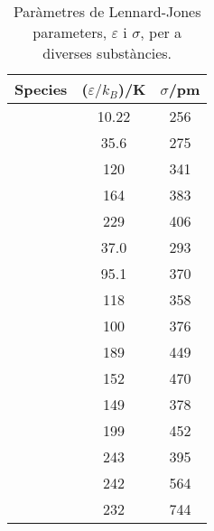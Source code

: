\begin{table}[h]
  \centering
  \caption{Paràmetres de Lennard-Jones parameters, $\varepsilon$ i $\sigma$, per a diverses substàncies.}
  \begin{tabular}{l S[table-format=3.1] S[table-format=3.0]}
      \hline
      \textbf{Species} & {($\varepsilon / k_B$)/K} & {$\sigma$/pm} \\
      \hline
         & 10.22  & 256  \\
         & 35.6   & 275  \\
         & 120    & 341  \\
         & 164    & 383  \\
         & 229    & 406  \\
         & 37.0   & 293  \\
         & 95.1   & 370  \\
         & 118    & 358  \\
         & 100    & 376  \\
        & 189    & 449  \\
        & 152    & 470  \\
        & 149    & 378  \\
       & 199    & 452  \\
       & 243    & 395  \\
       & 242    & 564  \\
       & 232 & 744  \\
      \hline
  \end{tabular}
\end{table}


